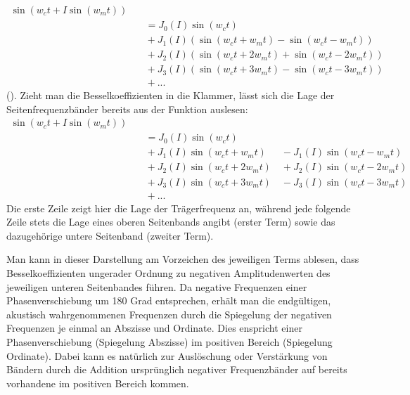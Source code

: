 \begin{equation}
\begin{split}
\sin(w_ct + I\sin(w_mt)) \\ &\quad = J_0(I)\sin(w_ct) \\ &\quad + J_1(I)(\sin(w_ct + w_mt) - \sin(w_ct - w_mt)) \\ &\quad + J_2(I)(\sin(w_ct + 2w_mt)+\sin(w_ct-2w_mt)) \\ &\quad  + J_3(I)(\sin(w_ct + 3w_mt) - \sin(w_ct - 3w_mt)) \\ &\quad  + ...
\end{split}
\end{equation}
(\cite[S.528]{chowningPaper}). Zieht man die Besselkoeffizienten in die Klammer, lässt sich die Lage der Seitenfrequenzbänder bereits aus der Funktion auslesen:
\begin{equation}\label{eq:FormelinchenBessel}
\begin{split}
\sin(w_ct + I\sin(w_mt)) \\ &\quad = J_0(I)\sin(w_ct) \\ &\quad + J_1(I)\sin(w_ct + w_mt) \quad\enspace - J_1(I)\sin(w_ct - w_mt) \\ &\quad + J_2(I)\sin(w_ct + 2w_mt) \quad + J_2(I)\sin(w_ct-2w_mt) \\ &\quad  + J_3(I)\sin(w_ct + 3w_mt) \quad - J_3(I)\sin(w_ct - 3w_mt) \\ &\quad  + ...
\end{split}
\end{equation}
Die erste Zeile zeigt hier die Lage der Trägerfrequenz an, während jede folgende Zeile stets die Lage eines oberen Seitenbands angibt (erster Term) sowie das dazugehörige untere Seitenband (zweiter Term). 

Man kann in dieser Darstellung am Vorzeichen des jeweiligen Terms ablesen, dass Besselkoeffizienten ungerader Ordnung zu negativen Amplitudenwerten des jeweiligen unteren Seitenbandes führen. Da negative Frequenzen einer Phasenverschiebung um 180 Grad entsprechen, erhält man die endgültigen, akustisch wahrgenommenen Frequenzen durch die Spiegelung der negativen Frequenzen je einmal an Abszisse und Ordinate. Dies enspricht einer Phasenverschiebung (Spiegelung Abszisse) im positiven Bereich (Spiegelung Ordinate). Dabei kann es natürlich zur Auslöschung oder Verstärkung von Bändern durch die Addition ursprünglich negativer Frequenzbänder auf bereits vorhandene im positiven Bereich kommen. 

